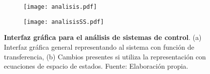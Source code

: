 
% 
% 

\newpage                                %

    \begin{figure}[htb]
        \centering
        \begin{subfigure}[t]{\textwidth}
            \centering
            \texttt{[image: analisis.pdf]}
            \caption{}
            \label{fig:interfazAnalisistf}
        \end{subfigure}
        \hfill
        \begin{subfigure}[t]{0.25\textwidth}
            \centering
            \texttt{[image: analisisSS.pdf]}
            \caption{}
            \label{fig:interfazAnalisisSS}
        \end{subfigure}
        \caption[Interfaz gráfica para el análisis de sistemas de control]{\textbf{Interfaz gráfica para el análisis de sistemas de control}. (a) Interfaz gráfica general representando al sistema con función de transferencia, (b) Cambios presentes si utiliza la representación con ecuaciones de espacio de estados. Fuente: Elaboración propia. \label{fig:interfazAnalisis}}
    \end{figure}


